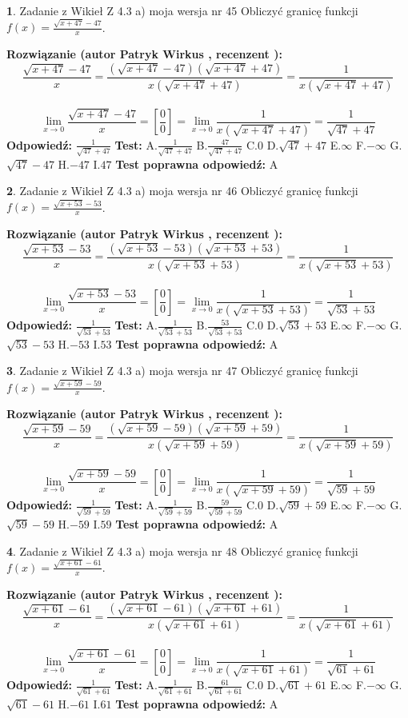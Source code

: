 \documentclass[12pt, a4paper]{article}
\theoremstyle{definition} %
\newtheorem{zad}{}
\newcommand{\zadStart}[1]{\begin{zad}#1\newline}
\newcommand{\zadStop}{\end{zad}}
\newcommand{\rozwStart}[2]{\noindent \textbf{Rozwiązanie (autor #1 , recenzent #2): }\newline}
\newcommand{\rozwStop}{\newline}
\newcommand{\odpStart}{\noindent \textbf{Odpowiedź:}\newline}
\newcommand{\odpStop}{\newline}
\newcommand{\testStart}{\noindent \textbf{Test:}\newline}
\newcommand{\testStop}{\newline}
\newcommand{\kluczStart}{\noindent \textbf{Test poprawna odpowiedź:}\newline}
\newcommand{\kluczStop}{\newline}
\begin{document}
\zadStart{Zadanie z Wikieł Z 4.3 a) moja wersja nr 45}
Obliczyć granicę funkcji $f(x)=\frac{\sqrt{x+47}-47}{x}$.
\zadStop
\rozwStart{Patryk Wirkus}{}
$$\frac{\sqrt{x+47}-47}{x}=\frac{(\sqrt{x+47}-47)(\sqrt{x+47}+47)}{x(\sqrt{x+47}+47)}=\frac{1}{x(\sqrt{x+47}+47)}$$
\\
$$\lim\limits_{x\to0}\frac{\sqrt{x+47}-47}{x}=[\frac{0}{0}]=
\lim\limits_{x\to0}\frac{1}{x(\sqrt{x+47}+47)} = \frac{1}{\sqrt{47}+47}$$
\rozwStop
\odpStart
$\frac{1}{\sqrt{47}+47}$
\odpStop
\testStart
A.$\frac{1}{\sqrt{47}+47}$
B.$\frac{47}{\sqrt{47}+47}$
C.$0$
D.$\sqrt{47}+47$
E.$\infty$
F.$-\infty$
G.$\sqrt{47}-47$
H.$-47$
I.$47$
\testStop
\kluczStart
A
\kluczStop



\zadStart{Zadanie z Wikieł Z 4.3 a) moja wersja nr 46}
Obliczyć granicę funkcji $f(x)=\frac{\sqrt{x+53}-53}{x}$.
\zadStop
\rozwStart{Patryk Wirkus}{}
$$\frac{\sqrt{x+53}-53}{x}=\frac{(\sqrt{x+53}-53)(\sqrt{x+53}+53)}{x(\sqrt{x+53}+53)}=\frac{1}{x(\sqrt{x+53}+53)}$$
\\
$$\lim\limits_{x\to0}\frac{\sqrt{x+53}-53}{x}=[\frac{0}{0}]=
\lim\limits_{x\to0}\frac{1}{x(\sqrt{x+53}+53)} = \frac{1}{\sqrt{53}+53}$$
\rozwStop
\odpStart
$\frac{1}{\sqrt{53}+53}$
\odpStop
\testStart
A.$\frac{1}{\sqrt{53}+53}$
B.$\frac{53}{\sqrt{53}+53}$
C.$0$
D.$\sqrt{53}+53$
E.$\infty$
F.$-\infty$
G.$\sqrt{53}-53$
H.$-53$
I.$53$
\testStop
\kluczStart
A
\kluczStop



\zadStart{Zadanie z Wikieł Z 4.3 a) moja wersja nr 47}
Obliczyć granicę funkcji $f(x)=\frac{\sqrt{x+59}-59}{x}$.
\zadStop
\rozwStart{Patryk Wirkus}{}
$$\frac{\sqrt{x+59}-59}{x}=\frac{(\sqrt{x+59}-59)(\sqrt{x+59}+59)}{x(\sqrt{x+59}+59)}=\frac{1}{x(\sqrt{x+59}+59)}$$
\\
$$\lim\limits_{x\to0}\frac{\sqrt{x+59}-59}{x}=[\frac{0}{0}]=
\lim\limits_{x\to0}\frac{1}{x(\sqrt{x+59}+59)} = \frac{1}{\sqrt{59}+59}$$
\rozwStop
\odpStart
$\frac{1}{\sqrt{59}+59}$
\odpStop
\testStart
A.$\frac{1}{\sqrt{59}+59}$
B.$\frac{59}{\sqrt{59}+59}$
C.$0$
D.$\sqrt{59}+59$
E.$\infty$
F.$-\infty$
G.$\sqrt{59}-59$
H.$-59$
I.$59$
\testStop
\kluczStart
A
\kluczStop



\zadStart{Zadanie z Wikieł Z 4.3 a) moja wersja nr 48}
Obliczyć granicę funkcji $f(x)=\frac{\sqrt{x+61}-61}{x}$.
\zadStop
\rozwStart{Patryk Wirkus}{}
$$\frac{\sqrt{x+61}-61}{x}=\frac{(\sqrt{x+61}-61)(\sqrt{x+61}+61)}{x(\sqrt{x+61}+61)}=\frac{1}{x(\sqrt{x+61}+61)}$$
\\
$$\lim\limits_{x\to0}\frac{\sqrt{x+61}-61}{x}=[\frac{0}{0}]=
\lim\limits_{x\to0}\frac{1}{x(\sqrt{x+61}+61)} = \frac{1}{\sqrt{61}+61}$$
\rozwStop
\odpStart
$\frac{1}{\sqrt{61}+61}$
\odpStop
\testStart
A.$\frac{1}{\sqrt{61}+61}$
B.$\frac{61}{\sqrt{61}+61}$
C.$0$
D.$\sqrt{61}+61$
E.$\infty$
F.$-\infty$
G.$\sqrt{61}-61$
H.$-61$
I.$61$
\testStop
\kluczStart
A
\kluczStop
\end{document}
